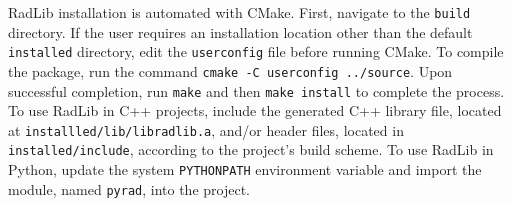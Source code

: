 \documentclass[preprint,12pt]{elsarticle}
\begin{document}
RadLib installation is automated with CMake. First, navigate to the \texttt{build} directory. If the user requires an installation location other than the default \texttt{installed} directory, edit the \texttt{user\textunderscore config} file before running CMake. To compile the package, run the command \texttt{cmake -C user\textunderscore config ../source}. Upon successful completion, run \texttt{make} and then \texttt{make install} to complete the process. To use RadLib in C++ projects, include the generated C++ library file, located at \texttt{installled/lib/libradlib.a}, and/or header files, located in \texttt{installed/include}, according to the project's build scheme. To use RadLib in Python, update the system \texttt{PYTHONPATH} environment variable and import the module, named \texttt{pyrad}, into the project. 
\end{document}
